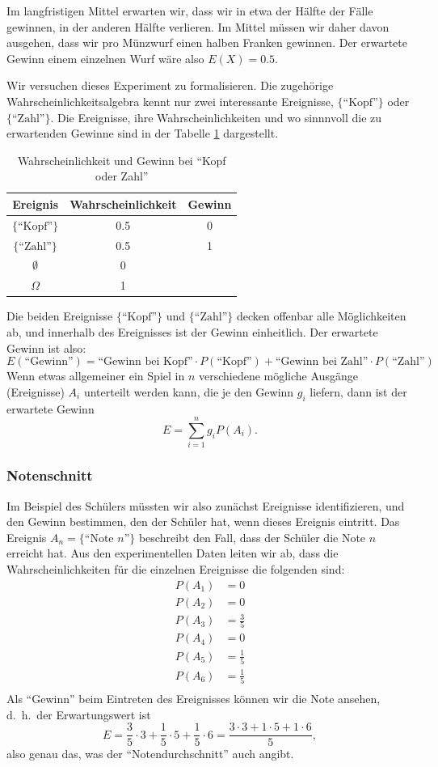 Im
langfristigen Mittel erwarten wir, dass wir in etwa der Hälfte
der Fälle gewinnen, in der anderen Hälfte verlieren.
Im Mittel
müssen wir daher davon ausgehen, dass wir pro Münzwurf einen
halben Franken gewinnen.
Der erwartete Gewinn einem einzelnen
Wurf wäre also $E(X)=0.5$.

Wir versuchen dieses Experiment zu formalisieren.
Die zugehörige
Wahrscheinlichkeitsalgebra kennt nur zwei interessante Ereignisse,
$\{\text{``Kopf''}\}$ oder $\{\text{``Zahl''}\}$.
Die Ereignisse, ihre Wahrscheinlichkeiten und wo sinnnvoll
die zu erwartenden Gewinne sind
in der Tabelle \ref{kopfzahlwahrscheinlichkeit} dargestellt.
\begin{table}
\begin{center}
\begin{tabular}{|c|c|c|}
\hline
Ereignis&Wahrscheinlichkeit&Gewinn\\
\hline
$\{\text{``Kopf''}\}$&0.5&0\\
$\{\text{``Zahl''}\}$&0.5&1\\
$\emptyset$&0&\\
$\Omega$&1&\\
\hline
\end{tabular}
\end{center}
\caption{Wahrscheinlichkeit und Gewinn bei ``Kopf oder Zahl''
\label{kopfzahlwahrscheinlichkeit}}
\end{table}
Die beiden Ereignisse $\{\text{``Kopf''}\}$ und $\{\text{``Zahl''}\}$
decken offenbar alle Möglichkeiten ab, und innerhalb des Ereignisses
ist der Gewinn einheitlich.
Der erwartete Gewinn ist also:
\[
E(\text{``Gewinn''})=\text{``Gewinn bei Kopf''}\cdot P(\text{``Kopf''})
+\text{``Gewinn bei Zahl''}\cdot P(\text{``Zahl''})
\]
Wenn etwas allgemeiner ein Spiel in $n$ verschiedene mögliche
Ausgänge (Ereignisse) $A_i$ unterteilt werden kann, die je den
Gewinn $g_i$ liefern, dann ist der erwartete Gewinn
\[
E=\sum_{i=1}^{n}g_iP(A_i).
\]

\subsubsection{Notenschnitt}
Im Beispiel des Schülers müssten wir also zunächst Ereignisse
identifizieren, und den Gewinn bestimmen, den der Schüler hat, wenn
dieses Ereignis eintritt.
Das Ereignis $A_n=\{\text{``Note $n$''}\}$
beschreibt den Fall, dass der Schüler die Note $n$ erreicht hat.
Aus den experimentellen Daten leiten wir ab, dass die Wahrscheinlichkeiten
für die einzelnen Ereignisse die folgenden sind:
\begin{align*}
P(A_1)&=0\\
P(A_2)&=0\\
P(A_3)&=\frac35\\
P(A_4)&=0\\
P(A_5)&=\frac15\\
P(A_6)&=\frac15\\
\end{align*}
Als
``Gewinn'' beim Eintreten des Ereignisses können wir die Note
ansehen, d.~h.~der Erwartungswert ist 
\[
E=\frac35\cdot 3 + \frac15\cdot 5 + \frac15\cdot 6=\frac{3\cdot 3+ 1\cdot5 + 1\cdot6}{5},
\]
also genau das, was der ``Notendurchschnitt'' auch angibt.

